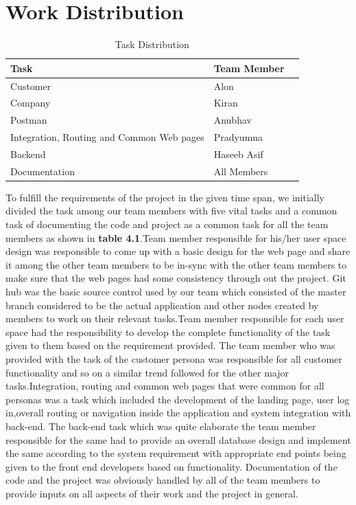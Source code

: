 \section{Work Distribution}
\begin{table}[!ht]
\begin{center}
\begin{tabular}{ |l|l|l| } 
 \hline
\textbf{Task} & \textbf{Team Member} \\
 \hline
Customer & Alon \\
 \hline
Company & Kiran  \\
 \hline
 Postman & Anubhav \\
 \hline
 Integration, Routing and Common Web pages & Pradyumna \\
 \hline
 Backend & Haseeb Asif \\
 \hline
  Documentation & All Members \\
 \hline
\end{tabular}
\end{center}
    \caption{ Task Distribution }
\end{table}
To fulfill the requirements of the project in the given time span, we initially divided the task among our team members with five vital tasks and a common task of documenting the code and project as a common task for all the team members as shown in \textbf{table 4.1}.Team member responsible for his/her user space design was responsible to come up with a basic design for the web page and share it among the other team members to be in-sync with the other team members to make sure that the web pages had some consistency through out the project. Git hub was the basic source control used by our team which consisted of the master branch considered to be the actual application and other nodes created by members to work on their relevant tasks.Team member responsible for each user space had the responsibility to develop the complete functionality of the task given to them based on the requirement provided. The team member who was provided with the task of the customer persona was responsible for all customer functionality and so on a similar trend followed for the other major tasks.Integration, routing and common web pages that were common for all personas was a task which included the development of the landing page, user log in,overall routing or navigation inside the application and system integration with back-end. The back-end task which was quite elaborate the team member responsible for the same had to provide an overall database design and implement the same according to the system requirement with appropriate end points being given to the front end developers based on functionality. Documentation of the code and the project was obviously handled by all of the team members to provide inputs on all aspects of their work and the project in general.

